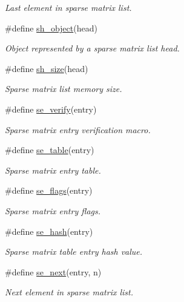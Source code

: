 \begin{CompactItemize}
\begin{CompactList}\small\item\em Last element in sparse matrix list. \item\end{CompactList}\item 
\#define \hyperlink{group__dbprim__smat_a36}{sh\_\-object}(head)
\begin{CompactList}\small\item\em Object represented by a sparse matrix list head. \item\end{CompactList}\item 
\#define \hyperlink{group__dbprim__smat_a37}{sh\_\-size}(head)
\begin{CompactList}\small\item\em Sparse matrix list memory size. \item\end{CompactList}\item 
\#define \hyperlink{group__dbprim__smat_a38}{se\_\-verify}(entry)
\begin{CompactList}\small\item\em Sparse matrix entry verification macro. \item\end{CompactList}\item 
\#define \hyperlink{group__dbprim__smat_a39}{se\_\-table}(entry)
\begin{CompactList}\small\item\em Sparse matrix entry table. \item\end{CompactList}\item 
\#define \hyperlink{group__dbprim__smat_a41}{se\_\-flags}(entry)
\begin{CompactList}\small\item\em Sparse matrix entry flags. \item\end{CompactList}\item 
\#define \hyperlink{group__dbprim__smat_a42}{se\_\-hash}(entry)
\begin{CompactList}\small\item\em Sparse matrix table entry hash value. \item\end{CompactList}\item 
\#define \hyperlink{group__dbprim__smat_a43}{se\_\-next}(entry, n)
\begin{CompactList}\small\item\em Next element in sparse matrix list. \item\end{CompactList}\item 

\end{CompactItemize}
